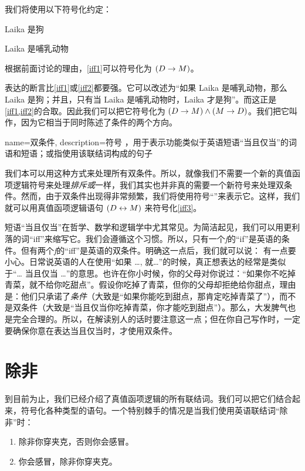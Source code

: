我们将使用以下符号化约定：

\begin{ekey}
		\item[D] Laika 是狗
		\item[M] Laika 是哺乳动物
	\end{ekey}

根据前面讨论的理由，\cref*{iff1}可以符号化为 $(D \rightarrow M)$。

表达的断言比\cref*{iff1}或\cref*{iff2}都要强。它可以改述为“如果 Laika 是哺乳动物，那么 Laika 是狗；并且，只有当 Laika 是哺乳动物时，Laika 才是狗”。而这正是\cref*{iff1,iff2}的合取。因此我们可以把它符号化为 $(D \rightarrow M) \wedge (M \rightarrow D)$。我们把它叫作，因为它相当于同时陈述了条件的两个方向。

{
name=双条件,
description={符号 \eiff，用于表示功能类似于英语短语“当且仅当”的词语和短语；或指使用该联结词构成的句子}
}

我们本可以用这种方式来处理所有双条件。所以，就像我们不需要一个新的真值函项逻辑符号来处理\emph{排斥或}一样，我们其实也并非真的需要一个新符号来处理双条件。然而，由于双条件出现得非常频繁，我们将使用符号“\eiff”来表示它。这样，我们就可以用真值函项逻辑语句 $(D \leftrightarrow M)$ 来符号化\cref*{iff3}。

短语“当且仅当”在哲学、数学和逻辑学中尤其常见。为简洁起见，我们可以用更利落的词“iff”来缩写它。我们会遵循这个习惯。所以，只有一个\emph{f}的“if”是英语的条件。但有两个\emph{f}的“iff”是英语的双条件。明确这一点后，我们就可以说：
有一点要小心。日常说英语的人在使用“如果 …, 就…”的时候，真正想表达的经常是类似于“… 当且仅当 …”的意思。也许在你小时候，你的父母对你说过：“如果你不吃掉青菜，就不给你吃甜点”。假设你吃掉了青菜，但你的父母却拒绝给你甜点，理由是：他们只承诺了\emph{条件}（大致是“如果你能吃到甜点，那肯定吃掉青菜了”），而不是双条件（大致是“当且仅当你吃掉青菜，你才能吃到甜点”）。那么，大发脾气也是完全合理的。所以，在解读别人的话时要注意这一点；但在你自己写作时，一定要确保你意在表达当且仅当时，才使用双条件。

\section{除非}
到目前为止，我们已经介绍了真值函项逻辑的所有联结词。我们可以把它们结合起来，符号化各种类型的语句。一个特别棘手的情况是当我们使用英语联结词“除非”时：

\begin{enumerate}
\item\label{unless1} 除非你穿夹克，否则你会感冒。
\item\label{unless2} 你会感冒，除非你穿夹克。
\end{enumerate}

